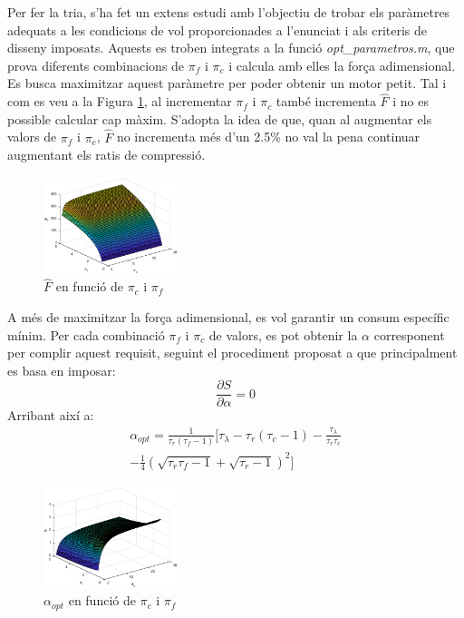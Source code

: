 \noindent Per fer la tria,  s'ha fet un extens estudi amb l'objectiu de trobar els paràmetres adequats a les condicions de vol proporcionades a l'enunciat i als criteris de disseny imposats. Aquests es troben integrats a la funció \textit{opt\_parametros.m}, que prova diferents combinacions de $\pi_f$ i $\pi_c$ i calcula amb elles la força adimensional. Es busca maximitzar aquest paràmetre per poder obtenir un motor petit. Tal i com es veu a la Figura \ref{Fadimensional}, al incrementar $\pi_f$ i $\pi_c$ també incrementa \(\hat{F}\) i no es possible calcular cap màxim. S'adopta la idea de que, quan al augmentar els valors de $\pi_f$ i $\pi_c$, \(\hat{F}\) no incrementa més d'un 2.5\% no val la pena continuar augmentant els ratis de compressió.
\begin{figure}[H]
	\centering
	\includegraphics[width=0.35\textwidth]{./pics/F_pc_pf}
	\caption{\(\hat{F}\) en funció de $\pi_c$ i $\pi_f$}
	\label{Fadimensional}
\end{figure}
\noindent A més de maximitzar la força adimensional, es vol garantir un consum específic mínim. Per cada combinació  $\pi_f$ i $\pi_c$ de valors, es pot obtenir la $\alpha$ corresponent per complir aquest requisit, seguint el procediment proposat a \cite[5-10]{mattingly} que principalment es basa en imposar:
\begin{equation*}
	\frac{\partial S}{\partial \alpha} = 0 
\end{equation*}
Arribant així a:
\begin{multline}
	\alpha_{opt} = \frac{1}{\tau_r(\tau_f-1)}\bigg[\tau_{\lambda}-\tau_r(\tau_c-1)-\frac{\tau_{\lambda}}{\tau_r\tau_c} \\ -\frac{1}{4}(\sqrt{\tau_r\tau_f-1} + \sqrt{\tau_r-1})^2\bigg]
\end{multline}
\begin{figure}[H]
	\centering
	\includegraphics[width=0.35\textwidth]{./pics/alpha_pc_pf}
	\caption{$\alpha_{opt}$ en funció de $\pi_c$ i $\pi_f$}
\end{figure}
